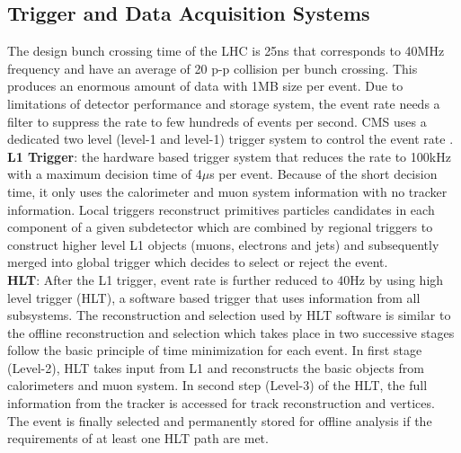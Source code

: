 \subsection{Trigger and Data Acquisition Systems}
The design bunch crossing time of the LHC is 25ns that corresponds to 40MHz frequency and have an average of 20 p-p collision per bunch crossing. This produces an enormous amount of data with 1MB size per event. Due to limitations of detector performance and storage system, the event rate needs a filter to suppress the rate to few hundreds of events per second. CMS uses a dedicated two level (level-1 and level-1) trigger system to control the event rate \cite{cms_trigger}.\\
\textbf{L1 Trigger}: the hardware based trigger system that reduces the rate to 100kHz with a maximum decision time of 4$\mu$s per event. Because of the short decision time, it only uses the calorimeter and muon system information with no tracker information. Local triggers reconstruct primitives particles candidates in each component of a given subdetector which are combined by regional triggers to construct higher level L1 objects (muons, electrons and jets) and subsequently merged into global trigger which decides to select or reject the event. \\
\textbf{HLT}: After the L1 trigger, event rate is further reduced to 40Hz by using high level trigger (HLT), a software based trigger that uses information from all subsystems. The reconstruction and selection used by HLT software is similar to the offline reconstruction and selection which takes place in two successive stages follow the basic principle of time minimization for each event. In first stage (Level-2), HLT takes input from L1 and reconstructs the basic objects from calorimeters and muon system. In second step (Level-3) of the HLT, the full information from the tracker is accessed for track reconstruction and vertices. The event is finally selected and permanently stored for offline analysis if the requirements of at least one HLT path are met.

  



\clearpage{\pagestyle{empty}\cleardoublepage}
